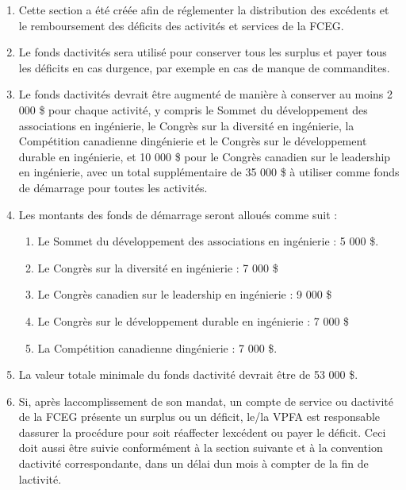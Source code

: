 \begin{enumerate}
 \item
  Cette section a été créée afin de réglementer la distribution des excédents et le remboursement des déficits des activités et services de la FCEG.
 \item
  Le fonds d\textquotesingle activités sera utilisé pour conserver tous les surplus et payer tous les déficits en cas d\textquotesingle urgence, par exemple en cas de manque de commandites.
 \item
  Le fonds d\textquotesingle activités devrait être augmenté de manière à conserver au moins 2 000 \$ pour chaque activité, y compris le Sommet du développement des associations en ingénierie, le Congrès sur la diversité en ingénierie, la Compétition canadienne d\textquotesingle ingénierie et le Congrès sur le développement durable en ingénierie, et 10 000 \$ pour le Congrès canadien sur le leadership en ingénierie, avec un total supplémentaire de 35 000 \$ à utiliser comme fonds de démarrage pour toutes les activités.
 \item
  Les montants des fonds de démarrage seront alloués comme suit :

  \begin{enumerate}
   \item
    Le Sommet du développement des associations en ingénierie : 5 000 \$.
   \item
    Le Congrès sur la diversité en ingénierie : 7 000 \$
   \item
    Le Congrès canadien sur le leadership en ingénierie : 9 000 \$
   \item
    Le Congrès sur le développement durable en ingénierie : 7 000 \$
   \item
    La Compétition canadienne d\textquotesingle ingénierie : 7 000 \$.
  \end{enumerate}
 \item
  La valeur totale minimale du fonds d\textquotesingle activité devrait être de 53 000 \$.
 \item
  Si, après l\textquotesingle accomplissement de son mandat, un compte de service ou d\textquotesingle activité de la FCEG présente un surplus ou un déficit, le/la VPFA est responsable d\textquotesingle assurer la procédure pour soit réaffecter l\textquotesingle excédent ou payer le déficit. Ceci doit aussi être suivie conformément à la section suivante et à la convention d\textquotesingle activité correspondante, dans un délai d\textquotesingle un mois à compter de la fin de l\textquotesingle activité.
\end{enumerate}

